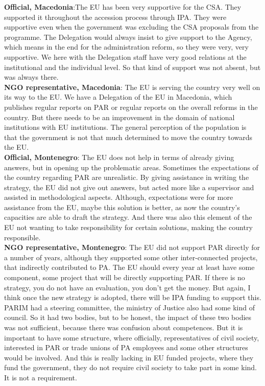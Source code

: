 \textbf{Official, Macedonia}:The EU has been very supportive for the CSA. They supported it throughout the accession process through IPA. They were supportive even when the government was excluding the CSA proposals from the programme. The Delegation would always insist to give support to the Agency, which means in the end for the administration reform, so they were very, very supportive. We here with the Delegation staff have very good relations at the institutional and the individual level. So that kind of support was not absent, but was always there. \\
\textbf{NGO representative, Macedonia}: The EU is serving the country very well on its way to the EU. We have a Delegation of the EU in Macedonia, which publishes regular reports on PAR or regular reports on the overall reforms in the country. But there needs to be an improvement in the domain of national institutions with EU institutions. The general perception of the population is that the government is not that much determined to move the country towards the EU.  \\
\textbf{Official, Montenegro}: The EU does not help in terms of already giving answers, but in opening up the problematic areas. Sometimes the expectations of the country regarding PAR are unrealistic. By giving assistance in writing the strategy, the EU did not give out answers, but acted more like a supervisor and assisted in methodological aspects. Although, expectations were for more assistance from the EU, maybe this solution is better, as now the country’s capacities are able to draft the strategy. And there was also this element of the EU not wanting to take responsibility for certain solutions, making the country responsible.  \\
\textbf{NGO representative, Montenegro}: The EU did not support PAR directly for a number of years, although they supported some other inter-connected projects, that indirectly contributed to PA. The EU should every year at least have some component, some project that will be directly supporting PAR. If there is no strategy, you do not have an evaluation, you don’t get the money. But again, I think once the new strategy is adopted, there will be IPA funding to support this. PARIM had a steering committee, the ministry of Justice also had some kind of council. So it had two bodies, but to be honest, the impact of these two bodies was not sufficient, because there was confusion about competences. But it is important to have some structure, where officially, representatives of civil society, interested in PAR or trade unions of PA employees and some other structures would be involved. And this is really lacking in EU funded projects, where they fund the government, they do not require civil society to take part in some kind. It is not a requirement.%
